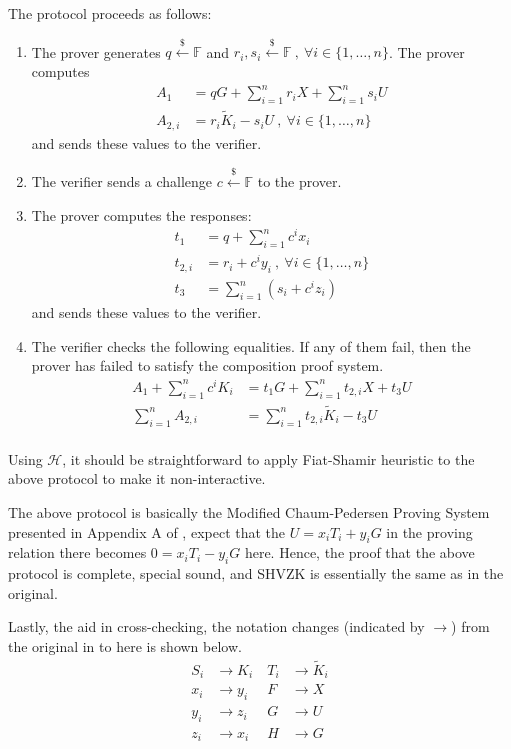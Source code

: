 \documentclass{article}
\begin{document}
The protocol proceeds as follows:
\begin{enumerate}
\item The prover generates $q\xleftarrow{\$}\mathbb{F}$ and $r_i, s_i \xleftarrow{\$}\mathbb{F}\ ,\ \forall i\in\{1,\ldots,n\}$. The prover computes
\begin{align*}
A_1 &= qG + \sum_{i=1}^n{r_i X} + \sum_{i=1}^n{s_i U} \\
A_{2,i} &= r_i \tilde{K}_i - s_i U\ ,\ \forall i\in\{1,\ldots,n\}
\end{align*}
and sends these values to the verifier.
\item The verifier sends a challenge $c\xleftarrow{\$}\mathbb{F}$ to the prover.
\item The prover computes the responses:
\begin{align*}
t_1 &= q + \sum_{i=1}^n c^i x_i \\
t_{2,i} &= r_i + c^i y_i\ ,\ \forall i\in\{1,\ldots,n\} \\
t_3 &= \sum_{i=1}^n (s_i + c^i z_i)
\end{align*}
and sends these values to the verifier.
\item The verifier checks the following equalities. If any of them fail, then the prover has failed to satisfy the composition proof system.
\begin{align*}
A_1 + \sum_{i=1}^{n}{c^i K_i} &= t_1 G + \sum_{i=1}^n{t_{2,i} X} + t_3 U \\
\sum_{i=1}^{n} A_{2,i} &= \sum_{i=1}^{n} t_{2,i}\tilde{K}_i - t_3 U \\
\end{align*}
\end{enumerate}
Using $\mathcal{H}$, it should be straightforward to apply Fiat-Shamir heuristic \cite{fiat-shamir} to the above protocol to make it non-interactive.

The above protocol is basically the Modified Chaum-Pedersen Proving System presented in Appendix A of \cite{lelantus-spark}, expect that the $U = x_i T_i + y_i G$ in the proving relation there becomes $0 = x_i T_i - y_i G$ here. Hence, the proof that the above protocol is complete, special sound, and SHVZK is essentially the same as in the original.

Lastly, the aid in cross-checking, the notation changes (indicated by $\rightarrow$) from the original in \cite{lelantus-spark} to here is shown below.
\begin{align*}
S_i &\rightarrow K_i&\ T_i &\rightarrow \tilde{K}_i \\
x_i &\rightarrow y_i&\ F &\rightarrow X \\
y_i &\rightarrow z_i&\ G &\rightarrow U \\
z_i &\rightarrow x_i&\ H &\rightarrow G
\end{align*}


\end{document}
